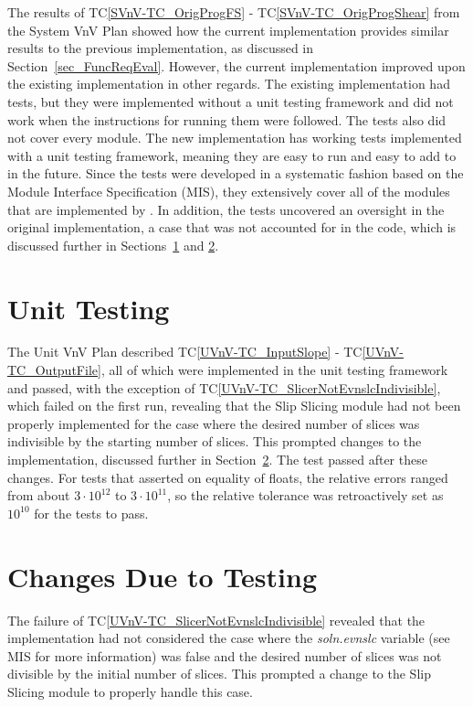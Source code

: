 \documentclass[12pt, titlepage]{article}
\newcommand{\tcref}[1]{TC\ref{#1}}
\begin{document}
The results of \tcref{SVnV-TC_OrigProgFS} - \tcref{SVnV-TC_OrigProgShear} from 
the System VnV Plan showed how the current implementation provides similar 
results to the previous implementation, as discussed in 
Section~\ref{sec_FuncReqEval}. However, the current implementation improved 
upon the existing implementation in other regards. The existing implementation 
had tests, but they were implemented without a unit testing framework and did 
not work when the instructions for running them were followed. The tests also 
did not cover every module. The new implementation has working tests 
implemented with a unit testing framework, meaning they are easy to run and 
easy to add to in the future. Since the tests were developed in a systematic 
fashion based on the Module Interface Specification (MIS), they extensively 
cover all of the modules that are implemented by \progname{}. In addition, the 
tests uncovered an oversight in the original implementation, a case that was 
not accounted for in the code, which is discussed further in 
Sections~\ref{sec_UnitTests} and \ref{sec_Changes}.

\section{Unit Testing}  \label{sec_UnitTests}
The Unit VnV Plan described \tcref{UVnV-TC_InputSlope} - 
\tcref{UVnV-TC_OutputFile}, all of which were implemented in the unit testing 
framework and passed, with the exception of 
\tcref{UVnV-TC_SlicerNotEvnslcIndivisible}, which failed on the first run, 
revealing that the Slip Slicing module had not been properly implemented for 
the case where the desired number of slices was indivisible by the starting 
number of slices. This prompted changes to the implementation, discussed 
further in Section~\ref{sec_Changes}. The test passed after these changes. For 
tests that asserted on equality of floats, the relative errors ranged from 
about $3 \cdot 10^{12}$ to $3 \cdot 10^{11}$, so the relative tolerance was 
retroactively set as $10^{10}$ for the tests to pass.

\section{Changes Due to Testing} \label{sec_Changes}
The failure of \tcref{UVnV-TC_SlicerNotEvnslcIndivisible} revealed that the 
implementation had not considered the case where the \textit{soln.evnslc} 
variable (see MIS for more information) was false and the desired number of 
slices was not divisible by the initial number of slices. This prompted a 
change to the Slip Slicing module to properly handle this case. 
\end{document}
